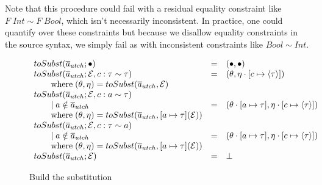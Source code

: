 Note that this procedure could fail with a residual equality constraint like $F
\; Int \sim F \; Bool$, which isn't necessarily inconsistent. In practice, one
could quantify over these constraints but because we disallow equality
constraints in the source syntax, we simply fail as with inconsistent constraints
like $Bool \sim Int$.
\begin{figure}
\[
\begin{array}{l c l}
toSubst(\overline{a}_{utch}; \bullet) &=& (\bullet, \bullet)
\\
toSubst(\overline{a}_{utch}; \mathcal{E}, c : \tau \sim \tau) &=&
(\theta, \eta \cdot [c \mapsto \langle \tau \rangle] )
\\ \qquad \text{where} \; (\theta, \eta) = toSubst(\overline{a}_{utch}, \mathcal{E})
\\
toSubst(\overline{a}_{utch}; \mathcal{E}, c : a \sim \tau)
\\ \qquad \mid a \notin \overline{a}_{utch} &=& (\theta \cdot [a \mapsto \tau], \eta
\cdot [c \mapsto \langle \tau \rangle])
\\ \qquad \text{where} \; (\theta, \eta) = toSubst(\overline{a}_{utch}, [a \mapsto
\tau](\mathcal{E}))
\\
toSubst(\overline{a}_{utch}; \mathcal{E}, c : \tau \sim a)
\\ \qquad \mid a \notin \overline{a}_{utch} &=& (\theta \cdot [a \mapsto \tau], \eta
\cdot [c \mapsto \langle \tau \rangle])
\\ \qquad \text{where} \; (\theta, \eta) = toSubst(\overline{a}_{utch}, [a \mapsto
\tau](\mathcal{E}))
\\
toSubst(\overline{a}_{utch}; \mathcal{E}) &=& \bot
\end{array}
\]
\caption{Build the substitution}
\label{fig:to-subst}
\end{figure}
